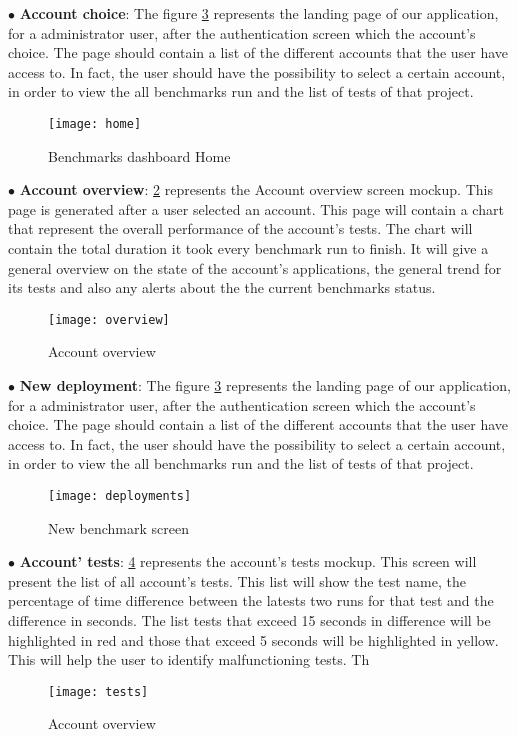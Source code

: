 $\bullet$ \textbf{Account choice}:
The figure
\hyperref[fig:benchmarks_dashboard_home]{\ref{fig:benchmarks_dashboard_home}}
represents the landing page of our application, for a administrator user,
after the authentication screen which the account's choice. The page should
contain a list of the different accounts that the user have access to. In fact,
the user should have the possibility to select a certain account, in order to
view the all benchmarks run and the list of tests of that project.

\begin{figure}[ht]
\texttt{[image: home]}
\caption{Benchmarks dashboard Home}
\label{fig:benchmarks_dashboard_home}
\end{figure}

$\bullet$ \textbf{Account overview}:
\hyperref[fig:benchmarks_dashboard_overview]{\ref{fig:benchmarks_dashboard_overview}}
represents the Account overview screen mockup. This page is generated after a
user selected an account. This page will contain a chart that represent the
overall performance of the account's tests. The chart will contain the total
duration it took every benchmark run to finish. It will give a general overview
on the state of the account's applications, the general trend for its tests and
also any alerts about the the current benchmarks status.

\begin{figure}[ht]
\texttt{[image: overview]}
\caption{Account overview}
\label{fig:benchmarks_dashboard_overview}
\end{figure}

$\bullet$ \textbf{New deployment}:
The figure
\hyperref[fig:benchmarks_dashboard_home]{\ref{fig:benchmarks_dashboard_home}}
represents the landing page of our application, for a administrator user,
after the authentication screen which the account's choice. The page should
contain a list of the different accounts that the user have access to. In fact,
the user should have the possibility to select a certain account, in order to
view the all benchmarks run and the list of tests of that project.

\begin{figure}[ht]
  \texttt{[image: deployments]}
  \caption{New benchmark screen}
\label{fig:benchmarks_dashboard_home}
\end{figure}

$\bullet$ \textbf{Account' tests}:
\hyperref[fig:benchmarks_dashboard_tests]{\ref{fig:benchmarks_dashboard_tests}}
represents the account's tests mockup. This screen will present the list of all
account's tests. This list will show the test name, the percentage of time
difference between the latests two runs for that test and the difference in
seconds. The list tests that exceed 15 seconds in difference will be highlighted
in red and those that exceed 5 seconds will be highlighted in yellow. This will
help the user to identify malfunctioning tests. Th

\begin{figure}[ht]
\texttt{[image: tests]}
\caption{Account overview}
\label{fig:benchmarks_dashboard_tests}
\end{figure}


